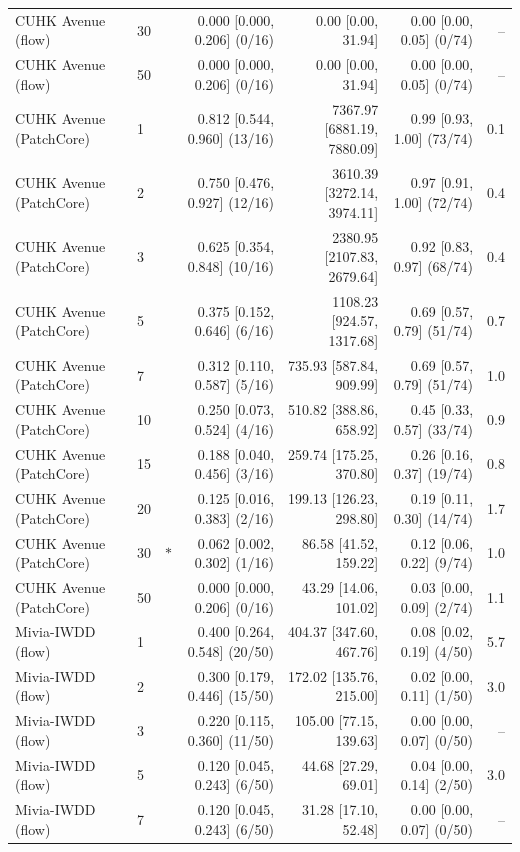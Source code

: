 \begin{table}[t]
{\begin{tabular}{llcrrrr}
CUHK Avenue (flow) & 30 &  & 0.000 [0.000, 0.206] (0/16) & 0.00 [0.00, 31.94] & 0.00 [0.00, 0.05] (0/74) & -- \\
CUHK Avenue (flow) & 50 &  & 0.000 [0.000, 0.206] (0/16) & 0.00 [0.00, 31.94] & 0.00 [0.00, 0.05] (0/74) & -- \\
CUHK Avenue (PatchCore) & 1 &  & 0.812 [0.544, 0.960] (13/16) & 7367.97 [6881.19, 7880.09] & 0.99 [0.93, 1.00] (73/74) & 0.1 \\
CUHK Avenue (PatchCore) & 2 &  & 0.750 [0.476, 0.927] (12/16) & 3610.39 [3272.14, 3974.11] & 0.97 [0.91, 1.00] (72/74) & 0.4 \\
CUHK Avenue (PatchCore) & 3 &  & 0.625 [0.354, 0.848] (10/16) & 2380.95 [2107.83, 2679.64] & 0.92 [0.83, 0.97] (68/74) & 0.4 \\
CUHK Avenue (PatchCore) & 5 &  & 0.375 [0.152, 0.646] (6/16) & 1108.23 [924.57, 1317.68] & 0.69 [0.57, 0.79] (51/74) & 0.7 \\
CUHK Avenue (PatchCore) & 7 &  & 0.312 [0.110, 0.587] (5/16) & 735.93 [587.84, 909.99] & 0.69 [0.57, 0.79] (51/74) & 1.0 \\
CUHK Avenue (PatchCore) & 10 &  & 0.250 [0.073, 0.524] (4/16) & 510.82 [388.86, 658.92] & 0.45 [0.33, 0.57] (33/74) & 0.9 \\
CUHK Avenue (PatchCore) & 15 &  & 0.188 [0.040, 0.456] (3/16) & 259.74 [175.25, 370.80] & 0.26 [0.16, 0.37] (19/74) & 0.8 \\
CUHK Avenue (PatchCore) & 20 &  & 0.125 [0.016, 0.383] (2/16) & 199.13 [126.23, 298.80] & 0.19 [0.11, 0.30] (14/74) & 1.7 \\
CUHK Avenue (PatchCore) & 30 & $\ast$ & 0.062 [0.002, 0.302] (1/16) & 86.58 [41.52, 159.22] & 0.12 [0.06, 0.22] (9/74) & 1.0 \\
CUHK Avenue (PatchCore) & 50 &  & 0.000 [0.000, 0.206] (0/16) & 43.29 [14.06, 101.02] & 0.03 [0.00, 0.09] (2/74) & 1.1 \\
Mivia-IWDD (flow) & 1 &  & 0.400 [0.264, 0.548] (20/50) & 404.37 [347.60, 467.76] & 0.08 [0.02, 0.19] (4/50) & 5.7 \\
Mivia-IWDD (flow) & 2 &  & 0.300 [0.179, 0.446] (15/50) & 172.02 [135.76, 215.00] & 0.02 [0.00, 0.11] (1/50) & 3.0 \\
Mivia-IWDD (flow) & 3 &  & 0.220 [0.115, 0.360] (11/50) & 105.00 [77.15, 139.63] & 0.00 [0.00, 0.07] (0/50) & -- \\
Mivia-IWDD (flow) & 5 &  & 0.120 [0.045, 0.243] (6/50) & 44.68 [27.29, 69.01] & 0.04 [0.00, 0.14] (2/50) & 3.0 \\
Mivia-IWDD (flow) & 7 &  & 0.120 [0.045, 0.243] (6/50) & 31.28 [17.10, 52.48] & 0.00 [0.00, 0.07] (0/50) & -- \\

\end{tabular}}
\end{table}
